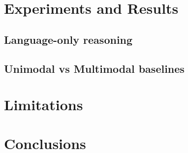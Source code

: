 \begin{itemize}
\section{Experiments and Results}
\subsection{Language-only reasoning}
\subsection{Unimodal vs Multimodal baselines}
\section{Limitations}
\section{Conclusions}
\end{itemize}




